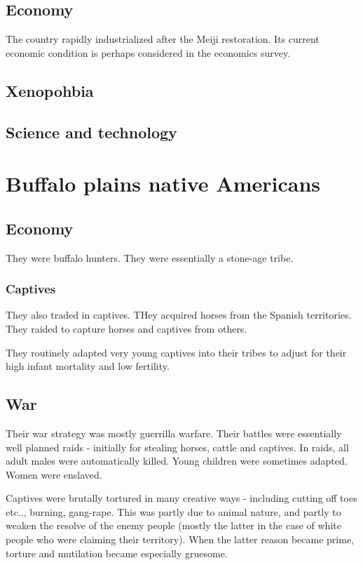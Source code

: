 \documentclass[oneside, article]{memoir}
\begin{document}
\section{Economy}
The country rapidly industrialized after the Meiji restoration. Its current economic condition is perhaps considered in the economics survey.

\section{Xenopohbia}
\tbc

\section{Science and technology}
\tbc

\chapter{Buffalo plains native Americans}
\section{Economy}
They were buffalo hunters. They were essentially a stone-age tribe.

\subsection{Captives}
They also traded in captives. THey acquired horses from the Spanish territories. They raided to capture horses and captives from others.

They routinely adapted very young captives into their tribes to adjust for their high infant mortality and low fertility.

\section{War}
Their war strategy was mostly guerrilla warfare. Their battles were essentially well planned raids - initially for stealing horses, cattle and captives. In raids, all adult males were automatically killed. Young children were sometimes adapted. Women were enslaved.

Captives were brutally tortured in many creative ways - including cutting off toes etc.., burning, gang-rape. This was partly due to animal nature, and partly to weaken the resolve of the enemy people (mostly the latter in the case of white people who were claiming their territory). When the latter reason became prime, torture and mutilation became especially gruesome.
\end{document}
